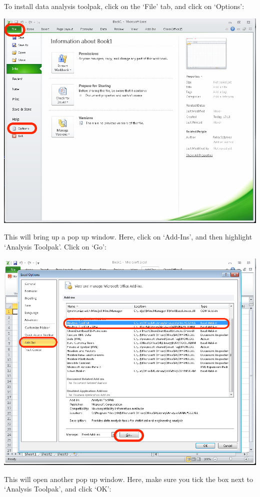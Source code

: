 \documentclass[
]{book}
\begin{document}
To install data analysis toolpak, click on the `File' tab, and click on `Options':

\includegraphics{imgs/file_tab_options.png}

This will bring up a pop up window. Here, click on `Add-Ins', and then highlight `Analysis Toolpak'. Click on `Go':

\includegraphics{imgs/install_analysis_toolpak.png}

This will open another pop up window. Here, make sure you tick the box next to `Analysis Toolpak', and click `OK':
\end{document}
